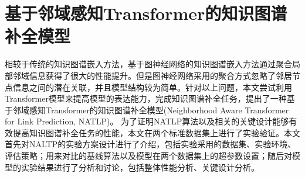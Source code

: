 \chapter{基于邻域感知Transformer的知识图谱补全模型}



相较于传统的知识图谱嵌入方法，基于图神经网络的知识图谱嵌入方法通过聚合局部邻域信息获得了很大的性能提升。但是图神经网络采用的聚合方式忽略了邻居节点信息之间的潜在关联，并且模型结构较为简单。针对以上问题，本文尝试利用Transformer模型来提高模型的表达能力，完成知识图谱补全任务，提出了一种基于邻域感知Transformer的知识图谱补全模型(Neighborhood Aware Transformer for Link Prediction, NATLP)。
为了证明NATLP算法以及相关的关键设计能够有效提高知识图谱补全任务的性能，本文在两个标准数据集上进行了实验验证。本文首先对NALTP的实验方案设计进行了介绍，包括实验采用的数据集、实验环境、评估策略；用来对比的基线算法以及模型在两个数据集上的超参数设置；随后对模型的实验结果进行了分析和讨论，包括整体性能分析、关键设计分析。





